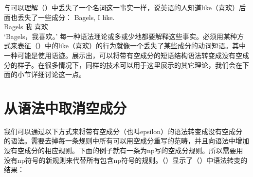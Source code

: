 与可以理解（）中丢失了一个名词这一事实一样，说英语的人知道like（喜欢）后面也丢失了一些成分：
\ea
\gll Bagels, I like.\\
	 Bagels 我 喜欢\\
\glt `Bagels，我喜欢。'
\z
每一种语法理论或多或少地都要解释这些事实。必须用某种方式来表征（）中的like（喜欢）的行为就像一个丢失了某些成分的动词短语。其中一种可能是使用语迹。\citet*[, \S~4.1]{BHPS61a}展示出，可以将带有空成分的短语结构语法转变成没有空成分的样子。在很多情况下，同样的技术可以用于这里展示的其它理论，我们会在下面的小节详细讨论这一点。

\section{从语法中取消空成分}
\label{Abschnitt-Eleminierung-leerer-Elemente}

我们可以通过以下方式来将带有空成分（也叫epsilon）的语法转变成没有空成分的语法。需要去掉每一条规则中所有可以用空成分重写的范畴，并且向语法中增加没有空成分的相应规则。下面的例子就有一条为np写的空成分规则。所以需要用没有np符号的新规则来代替所有包含np符号的规则。（）显示了（）中语法转变的结果：

